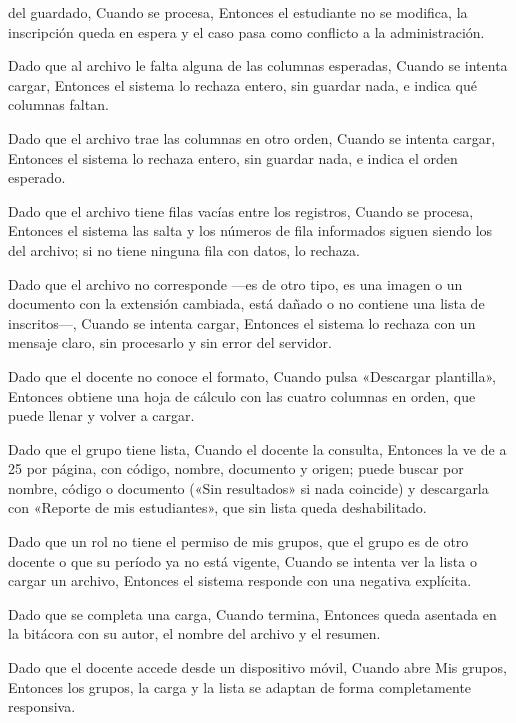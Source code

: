 {      del guardado, Cuando se procesa, Entonces el estudiante no se modifica, la
      inscripción queda en espera y el caso pasa como conflicto a la administración.
\item Dado que al archivo le falta alguna de las columnas esperadas, Cuando se intenta
      cargar, Entonces el sistema lo rechaza entero, sin guardar nada, e indica qué
      columnas faltan.
\item Dado que el archivo trae las columnas en otro orden, Cuando se intenta cargar,
      Entonces el sistema lo rechaza entero, sin guardar nada, e indica el orden
      esperado.
\item Dado que el archivo tiene filas vacías entre los registros, Cuando se procesa,
      Entonces el sistema las salta y los números de fila informados siguen siendo los
      del archivo; si no tiene ninguna fila con datos, lo rechaza.
\item Dado que el archivo no corresponde ---es de otro tipo, es una imagen o un documento
      con la extensión cambiada, está dañado o no contiene una lista de inscritos---,
      Cuando se intenta cargar, Entonces el sistema lo rechaza con un mensaje claro, sin
      procesarlo y sin error del servidor.
\item Dado que el docente no conoce el formato, Cuando pulsa «Descargar plantilla»,
      Entonces obtiene una hoja de cálculo con las cuatro columnas en orden, que puede
      llenar y volver a cargar.
\item Dado que el grupo tiene lista, Cuando el docente la consulta, Entonces la ve de a
      25 por página, con código, nombre, documento y origen; puede buscar por nombre,
      código o documento («Sin resultados» si nada coincide) y descargarla con «Reporte
      de mis estudiantes», que sin lista queda deshabilitado.
\item Dado que un rol no tiene el permiso de mis grupos, que el grupo es de otro docente
      o que su período ya no está vigente, Cuando se intenta ver la lista o cargar un
      archivo, Entonces el sistema responde con una negativa explícita.
\item Dado que se completa una carga, Cuando termina, Entonces queda asentada en la
      bitácora con su autor, el nombre del archivo y el resumen.
\item Dado que el docente accede desde un dispositivo móvil, Cuando abre Mis grupos,
      Entonces los grupos, la carga y la lista se adaptan de forma completamente
      responsiva.}

